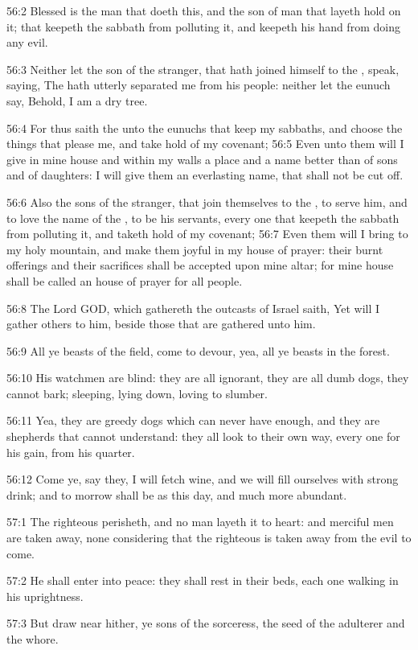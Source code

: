 56:2 Blessed is the man that doeth this, and the son of man that
layeth hold on it; that keepeth the sabbath from polluting it, and
keepeth his hand from doing any evil.

56:3 Neither let the son of the stranger, that hath joined himself to
the \LORD, speak, saying, The \LORD hath utterly separated me from his
people: neither let the eunuch say, Behold, I am a dry tree.

56:4 For thus saith the \LORD unto the eunuchs that keep my sabbaths,
and choose the things that please me, and take hold of my covenant;
56:5 Even unto them will I give in mine house and within my walls a
place and a name better than of sons and of daughters: I will give
them an everlasting name, that shall not be cut off.

56:6 Also the sons of the stranger, that join themselves to the \LORD,
to serve him, and to love the name of the \LORD, to be his servants,
every one that keepeth the sabbath from polluting it, and taketh hold
of my covenant; 56:7 Even them will I bring to my holy mountain, and
make them joyful in my house of prayer: their burnt offerings and
their sacrifices shall be accepted upon mine altar; for mine house
shall be called an house of prayer for all people.

56:8 The Lord GOD, which gathereth the outcasts of Israel saith, Yet
will I gather others to him, beside those that are gathered unto him.

56:9 All ye beasts of the field, come to devour, yea, all ye beasts in
the forest.

56:10 His watchmen are blind: they are all ignorant, they are all dumb
dogs, they cannot bark; sleeping, lying down, loving to slumber.

56:11 Yea, they are greedy dogs which can never have enough, and they
are shepherds that cannot understand: they all look to their own way,
every one for his gain, from his quarter.

56:12 Come ye, say they, I will fetch wine, and we will fill ourselves
with strong drink; and to morrow shall be as this day, and much more
abundant.

57:1 The righteous perisheth, and no man layeth it to heart: and
merciful men are taken away, none considering that the righteous is
taken away from the evil to come.

57:2 He shall enter into peace: they shall rest in their beds, each
one walking in his uprightness.

57:3 But draw near hither, ye sons of the sorceress, the seed of the
adulterer and the whore.


